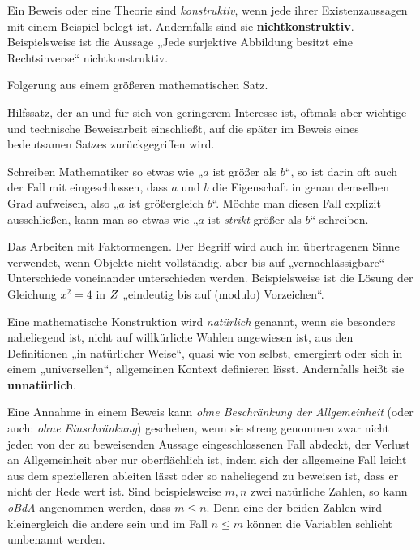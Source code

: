 \begin{description}[labelindent=0pt, leftmargin=0pt]
    \item[Konstruktiv:] Ein Beweis oder eine Theorie sind \emph{konstruktiv}, wenn jede ihrer Existenzaussagen mit einem Beispiel belegt ist. Andernfalls sind sie \textbf{nichtkonstruktiv}. Beispielsweise ist die Aussage „Jede surjektive Abbildung besitzt eine Rechtsinverse“ nichtkonstruktiv.

    \item[Korollar:] Folgerung aus einem größeren mathematischen Satz.

    \item[Lemma:] Hilfssatz, der an und für sich von geringerem Interesse ist, oftmals aber wichtige und technische Beweisarbeit einschließt, auf die später im Beweis eines bedeutsamen Satzes zurückgegriffen wird.

    \item[Mathematischer Komparativ:] Schreiben Mathematiker so etwas wie „$a$ ist größer als $b$“, so ist darin oft auch der Fall mit eingeschlossen, dass $a$ und $b$ die Eigenschaft in genau demselben Grad aufweisen, also „$a$ ist größergleich $b$“. Möchte man diesen Fall explizit ausschließen, kann man so etwas wie „$a$ ist \emph{strikt} größer als $b$“ schreiben.

    \item[Modulo:]  Das Arbeiten mit Faktormengen. Der Begriff wird auch im übertragenen Sinne verwendet, wenn Objekte nicht vollständig, aber bis auf „vernachlässigbare“ Unterschiede voneinander unterschieden werden. Beispielsweise ist die Lösung der Gleichung $x^2=4$ in $\relax Z$ „eindeutig bis auf (\glq modulo\grq) Vorzeichen“.

    \item[Natürlich:] Eine mathematische Konstruktion wird \emph{natürlich} genannt, wenn sie besonders naheliegend ist, nicht auf willkürliche Wahlen angewiesen ist, aus den Definitionen „in natürlicher Weise“, quasi wie von selbst, emergiert oder sich in einem „universellen“, allgemeinen Kontext definieren lässt. Andernfalls heißt sie \textbf{unnatürlich}.

    \item[Ohne Beschränkung der Allgemeinheit (OBdA):]  Eine Annahme in einem Beweis kann \emph{ohne Beschränkung der Allgemeinheit} (oder auch: \emph{ohne Einschränkung}) geschehen, wenn sie streng genommen zwar nicht jeden von der zu beweisenden Aussage eingeschlossenen Fall abdeckt, der Verlust an Allgemeinheit aber nur oberflächlich ist, indem sich der allgemeine Fall leicht aus dem spezielleren ableiten lässt oder so naheliegend zu beweisen ist, dass er nicht der Rede wert ist. Sind beispielsweise $m,n$ zwei natürliche Zahlen, so kann \emph{oBdA} angenommen werden, dass $m\le n$. Denn eine der beiden Zahlen wird kleinergleich die andere sein und im Fall $n\le m$ können die Variablen schlicht umbenannt werden.


\end{description}
